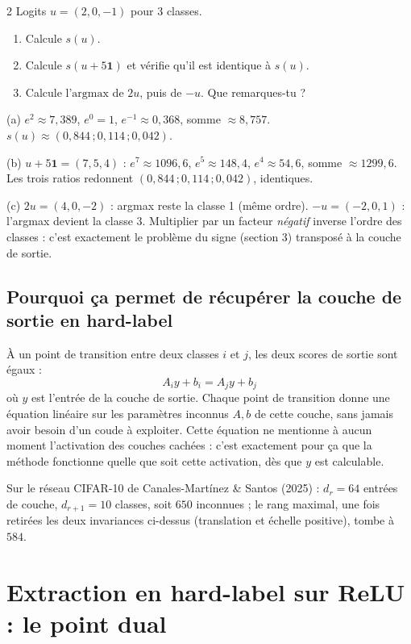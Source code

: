 \documentclass[11pt]{article}
\begin{document}
\begin{exo}{2}
Logits $u=(2,0,-1)$ pour 3 classes.
\begin{enumerate}[label=(\alph*)]
  \item Calcule $s(u)$.
  \item Calcule $s(u+5\mathbf{1})$ et vérifie qu'il est identique à $s(u)$.
  \item Calcule l'$\mathrm{argmax}$ de $2u$, puis de $-u$. Que remarques-tu ?
\end{enumerate}
\end{exo}
\begin{sol}
(a) $e^2\approx7{,}389$, $e^0=1$, $e^{-1}\approx0{,}368$, somme $\approx8{,}757$. $s(u)\approx(0{,}844\,;0{,}114\,;0{,}042)$.

(b) $u+5\mathbf{1}=(7,5,4)$ : $e^7\approx1096{,}6$, $e^5\approx148{,}4$, $e^4\approx54{,}6$, somme $\approx1299{,}6$. Les trois ratios redonnent $(0{,}844\,;0{,}114\,;0{,}042)$, identiques.

(c) $2u=(4,0,-2)$ : argmax reste la classe 1 (même ordre). $-u=(-2,0,1)$ : l'argmax devient la classe 3. Multiplier par un facteur \emph{négatif} inverse l'ordre des classes : c'est exactement le problème du signe (section 3) transposé à la couche de sortie.
\end{sol}

\subsection{Pourquoi ça permet de récupérer la couche de sortie en hard-label}

À un point de transition entre deux classes $i$ et $j$, les deux scores de sortie sont égaux :
\[ A_iy + b_i = A_jy + b_j \]
où $y$ est l'entrée de la couche de sortie. Chaque point de transition donne une équation linéaire sur les paramètres inconnus $A,b$ de cette couche, sans jamais avoir besoin d'un coude à exploiter. Cette équation ne mentionne à aucun moment l'activation des couches cachées : c'est exactement pour ça que la méthode fonctionne quelle que soit cette activation, dès que $y$ est calculable.

Sur le réseau CIFAR-10 de Canales-Martínez \& Santos (2025) : $d_r=64$ entrées de couche, $d_{r+1}=10$ classes, soit $650$ inconnues ; le rang maximal, une fois retirées les deux invariances ci-dessus (translation et échelle positive), tombe à $584$.

\section{Extraction en hard-label sur ReLU : le point dual}
\end{document}
